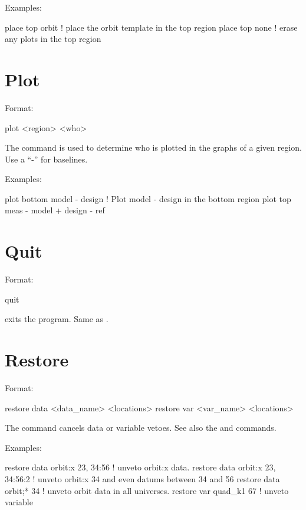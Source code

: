 Examples:
\begin{example}
  place top orbit  ! place the orbit template in the top region
  place top none   ! erase any plots in the top region
\end{example}

\section{Plot}
\label{s:plot}

Format:
\begin{example}
  plot <region> <who>
\end{example}

\vskip 0.2in 
The  command is used to determine who is plotted
in the graphs of a given region. Use a ``-'' for baselines. 

Examples:
\begin{example}
  plot bottom model - design       ! Plot model - design in the bottom region
  plot top meas - model + design - ref 
\end{example}

\section{Quit}
\label{s:quit}

Format:
\begin{example}
  quit
\end{example}

\vskip 0.2in
 exits the program. Same as .

\section{Restore}
\label{s:restore}

Format:
\begin{example}
  restore data  <data_name> <locations>
  restore var <var_name> <locations>
\end{example}

\vskip 0.2in 
The  command cancels data or variable
vetoes. See also the 
and  commands.

Examples:
\begin{example}
  restore data orbit:x  23, 34:56   ! unveto orbit:x data.
  restore data orbit:x  23, 34:56:2 ! unveto orbit:x 34 and even datums between
34 and 56
  restore data orbit;* 34           ! unveto orbit data in all universes.
  restore var quad_k1 67            ! unveto variable
\end{example}

